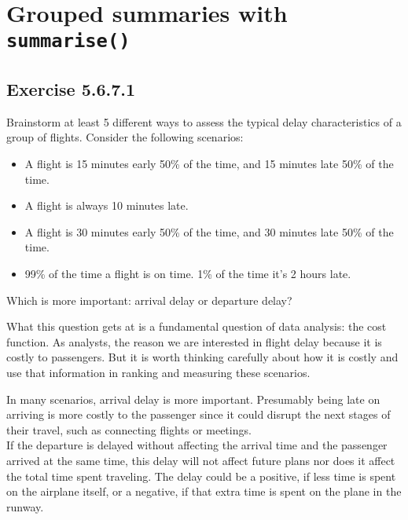 \documentclass[]{book}
\providecommand{\tightlist}{%
  \setlength{\itemsep}{0pt}\setlength{\parskip}{0pt}}
\theoremstyle{plain}
\theoremstyle{remark}
\begin{document}
\hypertarget{grouped-summaries-with-summarise}{%
\section{\texorpdfstring{Grouped summaries with
\texttt{summarise()}}{Grouped summaries with summarise()}}\label{grouped-summaries-with-summarise}}

\hypertarget{exercise-5.6.7.1}{%
\subsection*{\texorpdfstring{Exercise
{5.6.7.1}}{Exercise 5.6.7.1}}\label{exercise-5.6.7.1}}

Brainstorm at least 5 different ways to assess the typical delay
characteristics of a group of flights. Consider the following scenarios:

\begin{itemize}
\tightlist
\item
  A flight is 15 minutes early 50\% of the time, and 15 minutes late
  50\% of the time.
\item
  A flight is always 10 minutes late.
\item
  A flight is 30 minutes early 50\% of the time, and 30 minutes late
  50\% of the time.
\item
  99\% of the time a flight is on time. 1\% of the time it's 2 hours
  late.
\end{itemize}

Which is more important: arrival delay or departure delay?

What this question gets at is a fundamental question of data analysis:
the cost function. As analysts, the reason we are interested in flight
delay because it is costly to passengers. But it is worth thinking
carefully about how it is costly and use that information in ranking and
measuring these scenarios.

In many scenarios, arrival delay is more important. Presumably being
late on arriving is more costly to the passenger since it could disrupt
the next stages of their travel, such as connecting flights or
meetings.\\
If the departure is delayed without affecting the arrival time and the
passenger arrived at the same time, this delay will not affect future
plans nor does it affect the total time spent traveling. The delay could
be a positive, if less time is spent on the airplane itself, or a
negative, if that extra time is spent on the plane in the runway.
\end{document}
